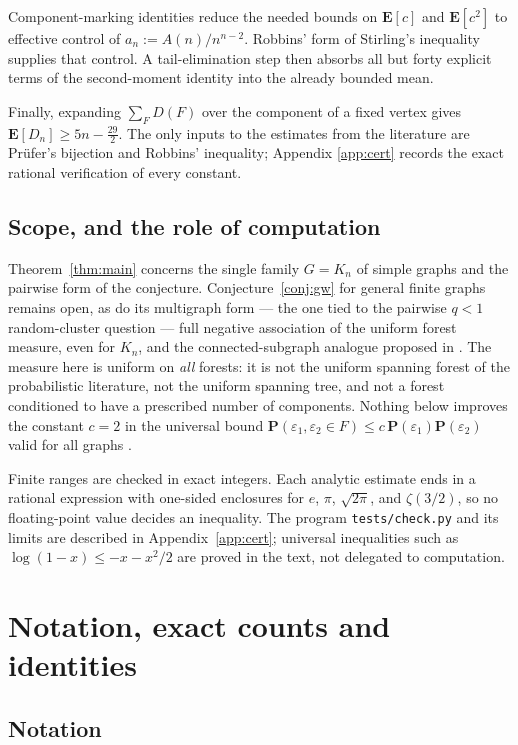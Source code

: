 \documentclass[11pt,a4paper]{amsart}
\theoremstyle{plain}
\theoremstyle{definition}
\newcommand{\PR}{\mathbf{P}}
\newcommand{\EX}{\mathbf{E}}
\begin{document}
Component-marking identities reduce the needed bounds on $\EX[c]$ and
$\EX[c^2]$ to effective control of $a_n:=A(n)/n^{n-2}$. Robbins' form of
Stirling's inequality supplies that control. A tail-elimination step then absorbs
all but forty explicit terms of the second-moment identity into the already
bounded mean.

Finally, expanding $\sum_FD(F)$ over the component of a fixed vertex gives
$\EX[D_n]\ge5n-\tfrac{29}{2}$. The only inputs to the estimates from the
literature are Pr\"ufer's bijection and Robbins' inequality; Appendix
\ref{app:cert} records the exact rational verification of every constant.

\subsection{Scope, and the role of computation}\label{ss:scope}

Theorem~\ref{thm:main} concerns the single family $G=K_n$ of simple graphs and
the pairwise form of the conjecture. Conjecture~\ref{conj:gw} for general finite
graphs remains open, as do its multigraph form --- the one tied to the pairwise
$q<1$ random-cluster question --- full negative association of the uniform forest
measure, even for $K_n$, and the connected-subgraph analogue proposed in
\cite{GW2004}. The measure here is uniform on \emph{all} forests: it is not the
uniform spanning forest of the probabilistic literature, not the uniform spanning
tree, and not a forest conditioned to have a prescribed number of components.
Nothing below improves the constant $c=2$ in the universal bound
$\PR(\varepsilon_1,\varepsilon_2\in F)\le c\,\PR(\varepsilon_1)\PR(\varepsilon_2)$
valid for all graphs \cite{BH2020}.

Finite ranges are checked in exact integers. Each analytic estimate ends in a
rational expression with one-sided enclosures for $e$, $\pi$, $\sqrt{2\pi}$,
and $\zeta(3/2)$, so no floating-point value decides an inequality. The program
\texttt{tests/check.py} and its limits are described in Appendix~\ref{app:cert};
universal inequalities such as $\log(1-x)\le-x-x^2/2$ are proved in the text,
not delegated to computation.

\section{Notation, exact counts and identities}\label{sec:prelim}

\subsection{Notation}
\end{document}
